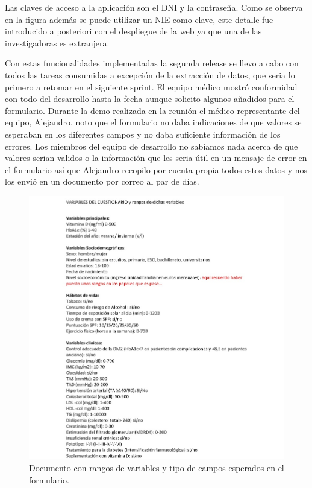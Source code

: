 Las claves de acceso a la aplicación son el DNI y la contraseña. Como se observa en la figura además se puede utilizar un NIE como clave, este detalle fue introducido a posteriori con el despliegue de la web ya que una de las investigadoras es extranjera.
\newline

Con estas funcionalidades implementadas la segunda release se llevo a cabo con todos las tareas consumidas a excepción de la extracción de datos, que seria lo primero a retomar en el siguiente sprint. El equipo médico mostró conformidad con todo del desarrollo hasta la fecha aunque solicito algunos añadidos para el formulario. Durante la demo realizada en la reunión el médico representante del equipo, Alejandro, noto que el formulario no daba indicaciones de que valores se esperaban en los diferentes campos y no daba suficiente información de los errores. Los miembros del equipo de desarrollo no sabíamos nada acerca de que valores serian validos o la información que les seria útil en un mensaje de error en el formulario así que Alejandro recopilo por cuenta propia todos estos datos y nos los envió en un documento por correo al par de días.

\begin{figure}[h]
    \centering
     \includegraphics[width=1\textwidth]{images/rangosVariables.jpg}
    \caption{Documento con rangos de variables y tipo de campos esperados en el formulario.}
\end{figure}
\newpage


